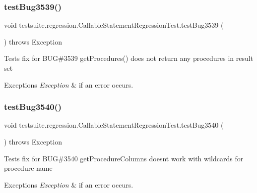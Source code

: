 \subsubsection{\texorpdfstring{test\+Bug3539()}{testBug3539()}}
{\footnotesize\ttfamily void testsuite.\+regression.\+Callable\+Statement\+Regression\+Test.\+test\+Bug3539 (\begin{DoxyParamCaption}{ }\end{DoxyParamCaption}) throws Exception}

Tests fix for B\+UG\#3539 get\+Procedures() does not return any procedures in result set


\begin{DoxyExceptions}{Exceptions}
{\em Exception} & if an error occurs. \\
\hline
\end{DoxyExceptions}
\mbox{\label{classtestsuite_1_1regression_1_1_callable_statement_regression_test_a060bce79977b8f767964814bd7f23f80}} 
\subsubsection{\texorpdfstring{test\+Bug3540()}{testBug3540()}}
{\footnotesize\ttfamily void testsuite.\+regression.\+Callable\+Statement\+Regression\+Test.\+test\+Bug3540 (\begin{DoxyParamCaption}{ }\end{DoxyParamCaption}) throws Exception}

Tests fix for B\+UG\#3540 get\+Procedure\+Columns doesn\textquotesingle{}t work with wildcards for procedure name


\begin{DoxyExceptions}{Exceptions}
{\em Exception} & if an error occurs. \\
\hline
\end{DoxyExceptions}
\mbox{\label{classtestsuite_1_1regression_1_1_callable_statement_regression_test_a9d71a6ee60ddbf67fdc1efadaca6af56}} 
